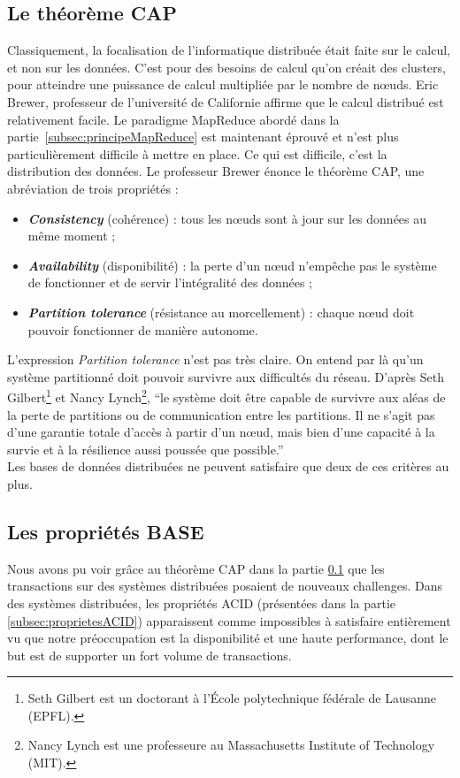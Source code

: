\subsection{Le théorème CAP}
\label{subsec:theoremeCAP}
	Classiquement, la focalisation de l'informatique distribuée était faite sur le calcul, et non sur les données. C'est pour des besoins de calcul qu'on créait des clusters, pour atteindre une puissance de calcul multipliée par le nombre de nœuds. Eric Brewer, professeur de l'université de Californie affirme que le calcul distribué est relativement facile. Le paradigme MapReduce abordé dans la partie~\ref{subsec:principeMapReduce} est maintenant éprouvé et n'est plus particulièrement difficile à mettre en place. Ce qui est difficile, c'est la distribution des données. Le professeur Brewer énonce le théorème CAP, une abréviation de trois propriétés :
	\vspace{10px}
	\begin{itemize}
		\item \textbf{\textit{Consistency}} (cohérence) : tous les nœuds sont à jour sur les données au même moment ;
		\item \textbf{\textit{Availability}} (disponibilité) : la perte d'un nœud n'empêche pas le système de fonctionner et de servir l'intégralité des données ;
		\item \textbf{\textit{Partition tolerance}} (résistance au morcellement) : chaque nœud doit pouvoir fonctionner de manière autonome.
	\end{itemize}
	\vspace{20px}
	L'expression \textit{Partition tolerance} n'est pas très claire. On entend par là qu'un système partitionné doit pouvoir survivre aux difficultés du réseau. D'après Seth Gilbert\footnote{Seth Gilbert est un doctorant à l'École polytechnique fédérale de Lausanne (EPFL).} et Nancy Lynch\footnote{Nancy Lynch est une professeure au Massachusetts Institute of Technology (MIT).}, \enquote{le système doit être capable de survivre aux aléas de la perte de partitions ou de communication entre les partitions. Il ne s'agit pas d'une garantie totale d'accès à partir d'un nœud, mais bien d'une capacité à la survie et à la résilience aussi poussée que possible.}\\

	Les bases de données distribuées ne peuvent satisfaire que deux de ces critères au plus.

\subsection{Les propriétés BASE}
\label{subsec:proprietesBASE}
	Nous avons pu voir grâce au théorème CAP dans la partie \ref{subsec:theoremeCAP} que les transactions sur des systèmes distribuées posaient de nouveaux challenges. Dans des systèmes distribuées, les propriétés ACID (présentées dans la partie \ref{subsec:proprietesACID}) apparaissent comme impossibles à satisfaire entièrement vu que notre préoccupation est la disponibilité et une haute performance, dont le but est de supporter un fort volume de transactions.\\

